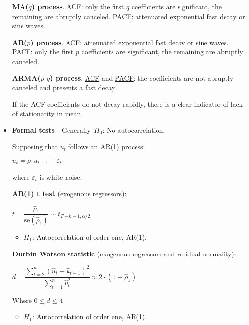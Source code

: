 \documentclass[10pt, a4paper, landscape]{article}
\newcommand{\se}{\mathrm{se}}
\begin{document}
\begin{multicols}{3}
\begin{itemize}[leftmargin=*]
			\textbf{MA($q$) process}. \underline{ACF}: only the first $q$ coefficients are significant, the remaining are abruptly canceled. \underline{PACF}: attenuated exponential fast decay or sine waves.
			
			\textbf{AR($p$) process}. \underline{ACF}: attenuated exponential fast decay or sine waves. \underline{PACF}: only the first $p$ coefficients are significant, the remaining are abruptly canceled.
			
			\columnbreak
			
			\textbf{ARMA($p, q$) process}. \underline{ACF} and \underline{PACF}: the coefficients are not abruptly canceled and presents a fast decay.

			If the ACF coefficients do not decay rapidly, there is a clear indicator of lack of stationarity in mean.
			
			\item \textbf{Formal tests} - Generally, $H_{0}$: No autocorrelation.
			
			Supposing that $u_{t}$ follows an AR(1) process:
			
			\begin{center}
				$u_{t} = \rho_{1} u_{t - 1} + \varepsilon_{t}$
			\end{center}
			
			where $\varepsilon_{t}$ is white noise.

			\textbf{AR(1) t test} (exogenous regressors):

			\begin{center}
				$t = \dfrac{\hat{\rho}_{1}}{\se(\hat{\rho}_{1})} \sim t_{T - k - 1, \alpha/2}$
			\end{center}

			\begin{itemize}[leftmargin=*]
				\item $H_{1}$: Autocorrelation of order one, AR(1).
			\end{itemize}

			\textbf{Durbin-Watson statistic} (exogenous regressors and residual normality):

			\begin{center}
				$d = \dfrac{\sum_{t=2}^{n} (\hat{u}_{t} - \hat{u}_{t - 1})^{2}}{\sum_{t=1}^{n} \hat{u}_{t}^{2}} \approx 2 \cdot (1 - \hat{\rho}_{1})$
			\end{center}
			
			Where $0 \leq d \leq 4$
			
			\begin{itemize}[leftmargin=*]
				\item $H_{1}$: Autocorrelation of order one, AR(1).
			\end{itemize}
			

\end{itemize}
\end{multicols}
\end{document}
